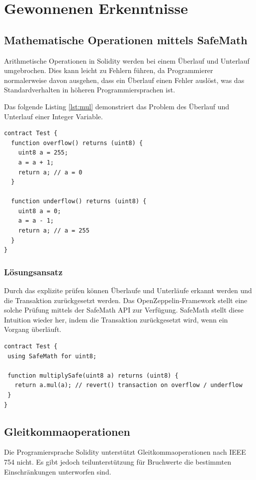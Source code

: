 \section{Gewonnenen Erkenntnisse}


\subsection{Mathematische Operationen mittels SafeMath}
Arithmetische Operationen in Solidity werden bei einem Überlauf und Unterlauf umgebrochen. Dies kann leicht zu Fehlern führen, da Programmierer normalerweise davon ausgehen, dass ein Überlauf einen Fehler auslöst, was das Standardverhalten in höheren Programmiersprachen ist.

Das folgende Listing \ref{lst:mul} demonstriert das Problem des Überlauf und Unterlauf einer Integer Variable.

\begin{lstlisting}[caption={Beispielhafter Überlauf und Unterlauf},captionpos=b,label=lst:mul]
contract Test {
  function overflow() returns (uint8) {
    uint8 a = 255;
    a = a + 1;  	
    return a; // a = 0
  }
  
  function underflow() returns (uint8) {
    uint8 a = 0;
    a = a - 1;  	
    return a; // a = 255
  }
}
\end{lstlisting}

\subsubsection*{Lösungsansatz}
Durch das explizite prüfen können Überlaufe und Unterläufe erkannt werden und die Transaktion zurückgesetzt werden. Das OpenZeppelin-Framework stellt eine solche Prüfung mittels der SafeMath API zur Verfügung. SafeMath stellt diese Intuition wieder her, indem die Transaktion zurückgesetzt wird, wenn ein Vorgang überläuft. \cite{safemath}

\begin{lstlisting}[caption={Beispielhafte Multiplikation mittels SafeMath zurück},captionpos=b,label=lst:mulsafe]
contract Test {
 using SafeMath for uint8;

 function multiplySafe(uint8 a) returns (uint8) {
   return a.mul(a); // revert() transaction on overflow / underflow
 }
}
\end{lstlisting}


\subsection{Gleitkommaoperationen}
Die Programiersprache Solidity unterstützt Gleitkommaoperationen nach IEEE 754 nicht. Es gibt jedoch teilunterstützung für Bruchwerte die bestimmten Einschränkungen unterworfen sind.\cite{fixedpointnumbers}

